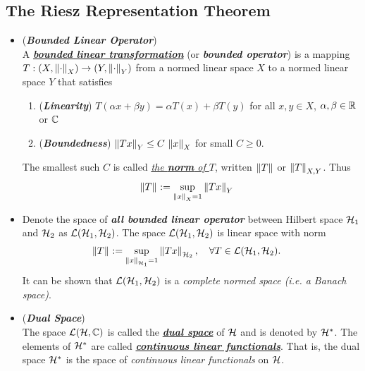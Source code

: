 \documentclass[11pt]{article}
\begin{document}
\subsection{The Riesz Representation Theorem}
\begin{itemize}
\item \begin{definition} (\emph{\textbf{Bounded Linear Operator}})\\
A \underline{\emph{\textbf{bounded linear transformation}}} (or \emph{\textbf{bounded operator}}) is a mapping $T: (X, \left\|\cdot\right\|_{X}) \rightarrow (Y, \left\|\cdot\right\|_{Y})$ from a normed linear space $X$ to a normed linear space $Y$ that satisfies 
\begin{enumerate}
\item (\emph{\textbf{Linearity}}) $T(\alpha x + \beta y) = \alpha T(x) + \beta T(y)$ for all $x, y \in X$, $\alpha, \beta \in {\mathbb R}$ or ${\mathbb C}$
\item (\emph{\textbf{Boundedness}}) $\left\|Tx\right\|_{Y} \le C\,\left\|x\right\|_{X}$ for small $C \ge 0$.
\end{enumerate} The smallest such $C$ is called \underline{\emph{the \textbf{norm} of $T$}}, written $\left\|T\right\|_{}$ or $\left\|T\right\|_{X, Y}$. Thus
\begin{align*}
\left\|T\right\|_{} &:= \sup_{\left\|x\right\|_{X} = 1 }\left\|Tx\right\|_{Y}
\end{align*}
\end{definition}

\item \begin{remark}
Denote the space of \emph{\textbf{all bounded linear operator}} between Hilbert space ${\mathcal H}_1$ and ${\mathcal H}_2$ as ${\mathcal L}({\mathcal H}_1, {\mathcal H}_2)$. The space ${\mathcal L}({\mathcal H}_1, {\mathcal H}_2)$ is linear space with norm 
\begin{align*}
\left\|T\right\|_{} &:= \sup_{\left\|x\right\|_{{\mathcal H}_1} = 1 }\left\|Tx\right\|_{{\mathcal H}_2}, \quad \forall T \in {\mathcal L}({\mathcal H}_1, {\mathcal H}_2).
\end{align*} It can be shown that ${\mathcal L}({\mathcal H}_1, {\mathcal H}_2)$ is a \emph{complete normed space (i.e. a Banach space)}.
\end{remark}

\item \begin{definition} (\emph{\textbf{Dual Space}})\\
The space ${\mathcal L}({\mathcal H}, {\mathbb C})$ is called the \underline{\emph{\textbf{dual space}}} of ${\mathcal H}$ and is denoted by ${\mathcal H}^{*}$. The elements of ${\mathcal H}^{*}$ are called \underline{\emph{\textbf{continuous linear functionals}}}. That is, the dual space ${\mathcal H}^{*}$ is the space of \emph{continuous linear functionals} on ${\mathcal H}$. 
\end{definition}


\end{itemize}
\end{document}
